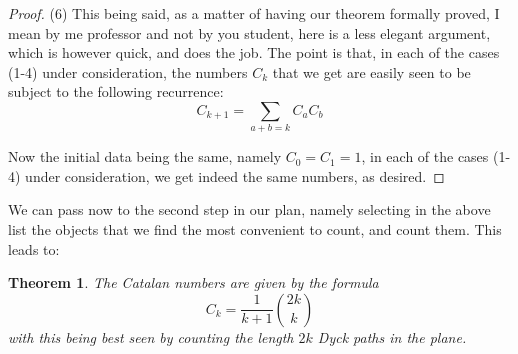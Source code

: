 \documentclass[12pt]{amsbook}
\newtheorem{theorem}{Theorem}[chapter]
\begin{document}
\begin{proof}
\medskip

(6) This being said, as a matter of having our theorem formally proved, I mean by me professor and not by you student, here is a less elegant argument, which is however quick, and does the job. The point is that, in each of the cases (1-4) under consideration, the numbers $C_k$ that we get are easily seen to be subject to the following recurrence:
$$C_{k+1}=\sum_{a+b=k}C_aC_b$$ 

Now the initial data being the same, namely $C_0=C_1=1$, in each of the cases (1-4) under consideration, we get indeed the same numbers, as desired.
\end{proof}

We can pass now to the second step in our plan, namely selecting in the above list the objects that we find the most convenient to count, and count them. This leads to:


\begin{theorem}
The Catalan numbers are given by the formula
$$C_k=\frac{1}{k+1}\binom{2k}{k}$$
with this being best seen by counting the length $2k$ Dyck paths in the plane.
\end{theorem}
\end{document}
